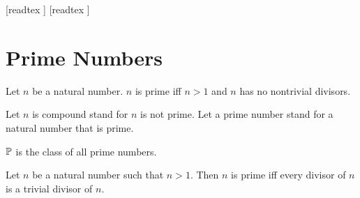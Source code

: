 \documentclass[10pt]{article}
\begin{document}
  \begin{imports}
    \begin{forthel}
      [readtex ]
      [readtex ]
    \end{forthel}
  \end{imports}


  \section*{Prime Numbers}

  \begin{forthel}
    \begin{definition}[id=ARITHMETIC_10_5450464558579712,printid]
      Let $n$ be a natural number.
      $n$ is prime iff $n > 1$ and $n$ has no nontrivial divisors.
    \end{definition}

    Let $n$ is compound stand for $n$ is not prime.
    Let a prime number stand for a natural number that is prime.
  \end{forthel}

  \begin{forthel}
    \begin{definition}[id=ARITHMETIC_10_3834705971511296,printid]
      $\mathbb{P}$ is the class of all prime numbers.
    \end{definition}
  \end{forthel}

  \begin{forthel}
    \begin{proposition}[id=ARITHMETIC_10_7801379464675328,printid]
      Let $n$ be a natural number such that $n > 1$.
      Then $n$ is prime iff every divisor of $n$ is a trivial divisor of $n$.
    \end{proposition}
  \end{forthel}
\end{document}
